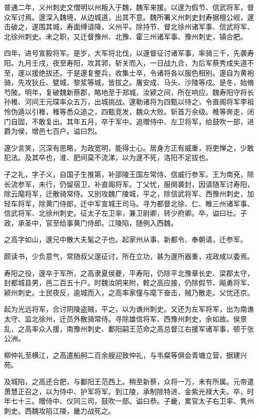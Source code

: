 \documentclass[12pt,UTF8]{ctexbook}
\begin{document}
普通二年，义州刺史文僧明以州叛入于魏，魏军来援。以邃为假节、信武将军，督众军讨焉。邃深入魏境，从边城道，出其不意。魏所署义州刺史封寿据檀公岘，邃击破之，遂围其城，寿面缚请降，义州平。除持节、督北徐州诸军事、信武将军、北徐州刺史。未之职，又迁督豫州、北豫、霍三州诸军事、豫州刺史，镇合肥。

四年，进号宣毅将军。是岁，大军将北伐，以邃督征讨诸军事，率骑三千，先袭寿阳。九月壬戌，夜至寿阳，攻其郛，斩关而入，一日战九合，为后军蔡秀成失道不至，邃以援绝拔还。于是邃复整兵，收集士卒，令诸将各以服色相别。邃自为黄袍骑，先攻狄丘、甓城、黎浆等城，皆拔之。屠安成、马头、沙陵等戍。是冬，始脩芍陂。明年，复破魏新蔡郡，略地至于郑城，汝颍之间，所在响应。魏寿阳守将长孙稚、河间王元琛率众五万，出城挑战。邃勒诸将为四甄以待之，令直阁将军李祖怜伪遁以引稚，稚等悉众追之，四甄竞发，魏众大败。斩首万余级。稚等奔走，闭门自固，不敢复出。其年五月，卒于军中。追赠侍中、左卫将军，给鼓吹一部，进爵为侯，增邑七百户。谥曰烈。

邃少言笑，沉深有思略，为政宽明，能得士心。居身方正有威重，将吏惮之，少敢犯法。及其卒也，淮、肥间莫不流涕，以为邃不死，洛阳不足拔也。

子之礼，字子义，自国子生推第，补邵陵王国左常侍、信威行参军。王为南兗，除长流参军，未行，仍留宿卫，补直阁将军。丁父忧，服阕袭封，因请随军讨寿阳，除云麾将军，迁散骑常侍。又别攻魏广陵城，平之，除信武将军、西豫州刺史，加轻车将军，除黄门侍郎，迁中军宣城王司马。寻为都督北徐、仁、睢三州诸军事、信武将军、北徐州刺史。征太子左卫率，兼卫尉卿，转少府卿。卒，谥曰壮。子政，承圣中，官至给事黄门侍郎。江陵陷，随例入西魏。

之高字如山，邃兄中散大夫髦之子也。起家州从事、新都令、奉朝请，迁参军。

颇读书，少负意气，常随叔父邃征讨，所在立功，甚为邃所器重，戎政咸以委焉。

寿阳之役，邃卒于军所，之高隶夏侯夔，平寿阳，仍除平北豫章长史、梁郡太守，封都城县男，邑二百五十户。时魏汝阴来附，敕之高应接，仍除假节、飚勇将军、颍州刺史。士民夜反，逾城而入，之高率家僮与麾下奋击，贼乃散走。父忧还京。

起为光远将军，合讨阴陵盗贼，平之，以为谯州刺史。又还为左军将军，出为南谯太守、监北徐州，迁员外散骑常侍。寻除雄信将军、西豫州刺史，余如故。侯景乱，之高率众入援，南豫州刺史、鄱阳嗣王范命之高总督江右援军诸军事，顿于张公洲。

柳仲礼至横江，之高遣船舸二百余艘迎致仲礼，与韦粲等俱会青塘立营，据建兴苑。

及城陷，之高还合肥，与鄱阳王范西上。稍至新蔡，众将一万，未有所属。元帝遣萧慧正召之，以为侍中、护军将军。到江陵，承制除特进、金紫光禄大夫。卒，时年七十三。赠侍中、仪同三司，鼓吹一部。谥曰恭。子畿，累官太子右卫率、隽州刺史。西魏攻陷江陵，畿力战死之。
\end{document}
